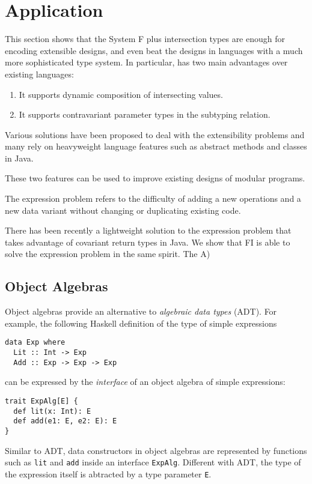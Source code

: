 \section{Application}




This section shows that the System F plus intersection types are enough for
encoding extensible designs, and even beat the designs in languages with a much
more sophisticated type system. In particular, \name has two main advantages
over existing languages:

\begin{enumerate}
\item It supports dynamic composition of intersecting values.
\item It supports contravariant parameter types in the subtyping relation.
\end{enumerate}

Various solutions have been proposed to deal with the extensibility problems and
many rely on heavyweight language features such as abstract methods and classes
in Java.

These two features can be used to improve existing designs of modular programs.


The expression problem refers to the difficulty of adding a new operations and a
new data variant without changing or duplicating existing code.

There has been recently a lightweight solution to the expression problem that
takes advantage of covariant return types in Java. We show that FI is able to
solve the expression problem in the same spirit. The
A)

\subsection{Object Algebras}

Object algebras provide an alternative to \emph{algebraic data types} (ADT). For example, the
following Haskell definition of the type of simple expressions
\begin{verbatim}
data Exp where
  Lit :: Int -> Exp
  Add :: Exp -> Exp -> Exp
\end{verbatim}
can be expressed by the \emph{interface} of an object algebra of simple expressions:
\begin{verbatim}
trait ExpAlg[E] {
  def lit(x: Int): E
  def add(e1: E, e2: E): E
}
\end{verbatim}
Similar to ADT, data constructors in object algebras are represented by functions such as
\lstinline{lit} and \lstinline{add} inside an interface \lstinline{ExpAlg}.
Different with ADT, the type of the expression itself is abtracted by a type
parameter \lstinline{E}.


